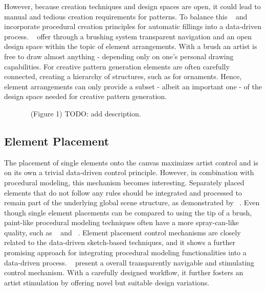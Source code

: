 However, because creation techniques and design spaces are open, it could lead to manual and tedious creation requirements for patterns. To balance this \citeauthor*{kazi_2012_vit}~\cite{kazi_2012_vit} and \citeauthor*{xing_2014_apr}~\cite{xing_2014_apr} incorporate procedural creation principles for automatic fillings into a data-driven process. \citeauthor*{hsu_2020_aef}~\cite{hsu_2020_aef} offer through a brushing system transparent navigation and an open design space within the topic of element arrangements. With a brush an artist is free to draw almost anything - depending only on one's personal drawing capabilities. For creative pattern generation elements are often carefully connected, creating a hierarchy of structures, such as for ornaments. Hence, element arrangements can only provide a subset - albeit an important one - of the design space needed for creative pattern generation. 

\begin{figure}[H]
    \centering
    \label{fig:xing_2014_apr}
    \caption{\citeauthor*{xing_2014_apr}~\cite{xing_2014_apr} (Figure 1) TODO: add description. \color{orange}{Status rights: ACM requested}}
\end{figure}

\subsection{Element Placement}
\label{subsubsec:analysis_creative_means_elements}

The placement of single elements onto the canvas maximizes artist control and is on its own a trivial data-driven control principle. However, in combination with procedural modeling, this mechanism becomes interesting. Separately placed elements that do not follow any rules should be integrated and processed to remain part of the underlying global scene structure, as demonstrated by \citeauthor*{gieseke_2017_ooo}~\cite{gieseke_2017_ooo}. Even though single element placements can be compared to using the tip of a brush, paint-like procedural modeling techniques often have a more spray-can-like quality, such as \citeauthor*{hsu_2020_aef}~\cite{hsu_2020_aef} and \citeauthor*{mech_2012_tdf}~\cite{mech_2012_tdf}. Element placement control mechanisms are closely related to the data-driven sketch-based techniques, and it shows a further promising approach for integrating procedural modeling functionalities into a data-driven process. \citeauthor*{guerrero_2016_pep}~\cite{guerrero_2016_pep} present a overall transparently navigable and stimulating control mechanism. With a carefully designed workflow, it further fosters an artist stimulation by offering novel but suitable design variations.


